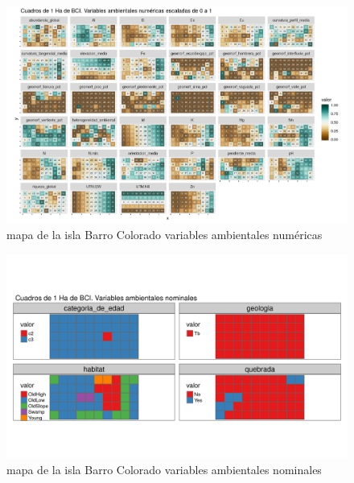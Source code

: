 \documentclass[11pt,]{article}
\begin{document}
\begin{figure}
\centering
\includegraphics[width=1.00000\textwidth]{mapas_variables_ambientales_numericas.png}
\caption{mapa de la isla Barro Colorado variables ambientales numéricas
\label{fig:bci_map}}
\end{figure}

\begin{figure}
\centering
\includegraphics[width=1.00000\textwidth]{mapas_variables_ambientales_nominales_tmap.png}
\caption{mapa de la isla Barro Colorado variables ambientales nominales
\label{fig:bci_map}}
\end{figure}
\end{document}

